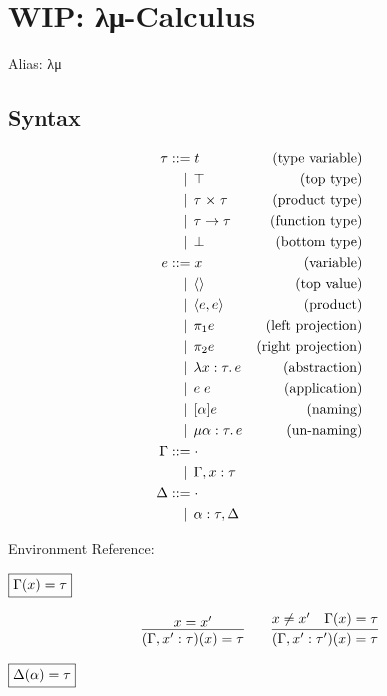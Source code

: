 \section{WIP: λμ-Calculus}

Alias: λμ

\subsection{Syntax}

\begin{align*}
  \tau
  &\BNFassign t &(\text{type variable}) \\
  &\BNFor \top &(\text{top type}) \\
  &\BNFor \tau \multi \tau &(\text{product type}) \\
  &\BNFor \tau \to \tau &(\text{function type}) \\
  &\BNFor \bot &(\text{bottom type}) \\
  e
  &\BNFassign x &(\text{variable}) \\
  &\BNFor \langle\rangle &(\text{top value}) \\
  &\BNFor \langle e, e\rangle &(\text{product}) \\
  &\BNFor \pi_1 e &(\text{left projection}) \\
  &\BNFor \pi_2 e &(\text{right projection}) \\
  &\BNFor \lambda x: \tau\ldotp e &(\text{abstraction}) \\
  &\BNFor e\; e &(\text{application}) \\
  &\BNFor [\alpha] e &(\text{naming}) \\
  &\BNFor \mu \alpha: \tau\ldotp e &(\text{un-naming}) \\
  \Gamma
  &\BNFassign \cdot \\
  &\BNFor \Gamma, x: \tau \\
  \Delta
  &\BNFassign \cdot \\
  &\BNFor \alpha: \tau, \Delta
\end{align*}

Environment Reference:

$\fbox{$\Gamma(x) = \tau$}$

\begin{gather*}
  \infer{(\Gamma, x': \tau)(x) = \tau}{
    x = x'
  }
  \hspace{2em}
  \infer{(\Gamma, x': \tau')(x) = \tau}{
    x \neq x'
    &
    \Gamma(x) = \tau
  }
\end{gather*}

$\fbox{$\Delta(\alpha) = \tau$}$

